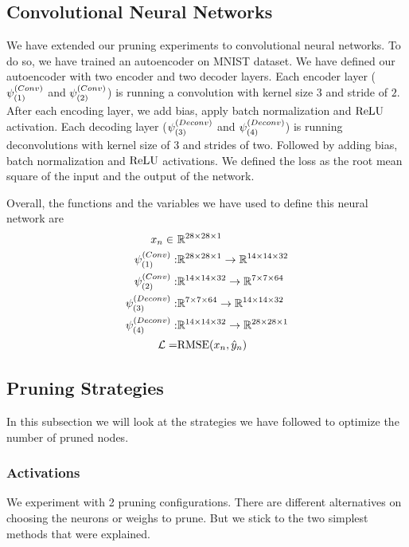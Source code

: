 \subsection{Convolutional Neural Networks}
We have extended our pruning experiments to convolutional neural networks. To do so, we have trained an autoencoder on MNIST dataset. We have defined our autoencoder with two encoder and two decoder layers. Each encoder layer ($\psi^{(Conv)}_{(1)}$ and $\psi^{(Conv)}_{(2)}$) is running a convolution with kernel size $3$ and stride of $2$. After each encoding layer, we add bias, apply batch normalization and $\textrm{ReLU}$ activation. Each decoding layer ($\psi^{(Deconv)}_{(3)}$ and $\psi^{(Deconv)}_{(4)}$) is running deconvolutions with kernel size of 3 and strides of two. Followed by adding bias, batch normalization and $\textrm{ReLU}$ activations. We defined the loss as the root mean square of the input and the output of the network. 

Overall, the functions and the variables we have used to define this neural network are
\begin{equation*}
\begin{split}
x_{n} \in \ &\mathbb{R}^{28 \times 28 \times 1}\\
\psi^{(Conv)}_{(1)}:& \mathbb{R}^{28 \times 28 \times 1} \rightarrow \mathbb{R}^{14 \times 14 \times 32} \\
\psi^{(Conv)}_{(2)}:& \mathbb{R}^{14 \times 14 \times 32} \rightarrow \mathbb{R}^{7 \times 7 \times 64} \\
\psi^{(Deconv)}_{(3)}:& \mathbb{R}^{7 \times 7 \times 64} \rightarrow \mathbb{R}^{14 \times 14 \times 32} \\
\psi^{(Deconv)}_{(4)}:& \mathbb{R}^{14 \times 14 \times 32} \rightarrow \mathbb{R}^{28 \times 28 \times 1} \\
\mathcal{L} =& \textrm{RMSE}(x_{n}, \hat{y}_{n})
\end{split}
\end{equation*}

\subsection{Pruning Strategies}
In this subsection we will look at the strategies we have followed to optimize the number of pruned nodes.
\subsubsection{Activations}
We experiment with 2 pruning configurations. There are different alternatives on choosing the neurons or weighs to prune. But we stick to the two simplest methods that were explained.

